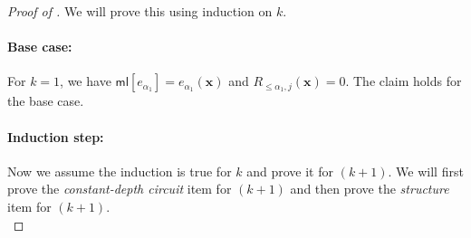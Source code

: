 \documentclass[10pt,a4paper]{amsart}
\newcommand{\ml}{\mathsf{ml}}
\begin{document}
\begin{proof}[Proof of ]
We will prove this using induction on $k$.
\paragraph{Base case:}For $k = 1$, we have $\ml[e_{\alpha_{1}}] = e_{\alpha_{1}}(\mathbf{x})$ and $R_{\leq \alpha_{1}, j}(\mathbf{x}) = 0$. The claim holds for the base case.

\paragraph{Induction step:}Now we assume the induction is true for $k$ and prove it for $(k+1)$. We will first prove the \emph{constant-depth circuit} item for $(k+1)$ and then prove the \emph{structure} item for $(k+1)$.\\


\end{proof}
\end{document}

